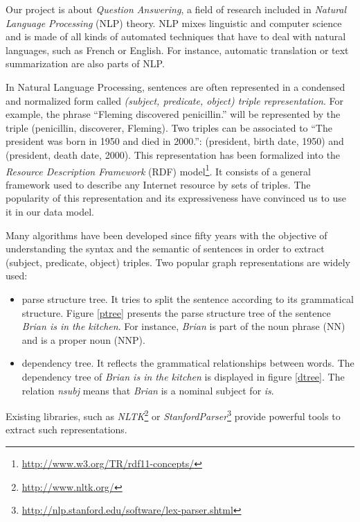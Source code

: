 Our project is about \textit{Question Answering}, a field of research included in \textit{Natural Language Processing} (NLP) theory. NLP mixes linguistic and computer science and is made of all kinds of automated techniques that have to deal with natural languages, such as French or English. For instance, automatic translation or text summarization are also parts of NLP.

In Natural Language Processing, sentences are often represented in a condensed and normalized form called \textit{(subject, predicate, object) triple representation}. For example, the phrase ``Fleming discovered penicillin.'' will be represented by the triple (penicillin, discoverer, Fleming). Two triples can be associated to ``The president was born in 1950 and died in 2000.'': (president, birth date, 1950) and (president, death date, 2000). This representation has been formalized into the \textit{Resource Description Framework} (RDF) model\footnote{\url{http://www.w3.org/TR/rdf11-concepts/}}. It consists of a general framework used to describe any Internet resource by sets of triples. The popularity of this representation and its expressiveness have convinced us to use it in our data model.

Many algorithms have been developed since fifty years with the objective of understanding the syntax and the semantic of sentences in order to extract (subject, predicate, object) triples. Two popular graph representations are widely used:
\begin{itemize}
 \item parse structure tree. It tries to split the sentence according to its grammatical structure. Figure \ref{ptree} presents the parse structure tree of the sentence \textit{Brian is in the kitchen}. For instance, \textit{Brian} is part of the noun phrase (NN) and is a proper noun (NNP).
 
 \item dependency tree. It reflects the grammatical relationships between words. The dependency tree of \textit{Brian is in the kitchen} is displayed in figure \ref{dtree}. The relation \textit{nsubj} means that \textit{Brian} is a nominal subject for \textit{is}. 
\end{itemize}
Existing libraries, such as \textit{NLTK}\footnote{\url{http://www.nltk.org/}} or \textit{StanfordParser}\footnote{\url{http://nlp.stanford.edu/software/lex-parser.shtml}} provide powerful tools to extract such representations.

